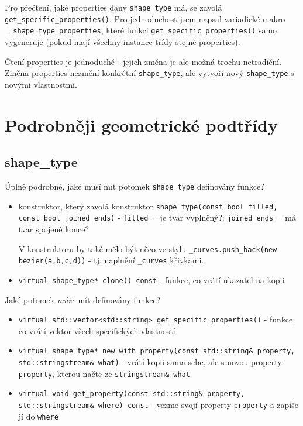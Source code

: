 \documentclass[11pt]{article} %
\begin{document}
Pro přečtení, jaké properties daný \texttt{shape\_type} má, se zavolá \texttt{get\_specific\_properties()}. Pro jednoduchost jsem napsal variadické makro \texttt{\_\_shape\_type\_properties}, které funkci \texttt{get\_specific\_properties()} samo vygeneruje (pokud mají všechny instance třídy stejné properties).

Čtení properties je jednoduché - jejich změna je ale možná trochu netradiční. Změna properties nezmění konkrétní \texttt{shape\_type}, ale vytvoří nový \texttt{shape\_type} s novými vlastnostmi.

\section{Podrobněji geometrické podtřídy}
\subsection{shape\_type}
Úplně podrobně, jaké musí mít potomek \texttt{shape\_type} definovány funkce?
\begin{itemize}
    \item konstruktor, který zavolá konstruktor \texttt{shape\_type(const bool filled, const bool joined\_ends)} - \texttt{filled} = je tvar vyplněný?; \texttt{joined\_ends} = má tvar spojené konce?

V konstruktoru by také mělo být něco ve stylu \texttt{\_curves.push\_back(new bezier(a,b,c,d))} - tj. naplnění \texttt{\_curves} křivkami.

    \item \texttt{virtual shape\_type* clone() const} - funkce, co vrátí ukazatel na kopii
\end{itemize}

Jaké potomek \emph{může} mít definovány funkce?

\begin{itemize}
    \item \texttt{virtual std::vector<std::string> get\_specific\_properties()} - funkce, co vrátí vektor všech specifických vlastností
    \item \texttt{virtual shape\_type* new\_with\_property(const std::string\& property, std::stringstream\& what)} - vrátí kopii sama sebe, ale s novou property \texttt{property}, kterou načte ze \texttt{stringstream\& what}
    \item \texttt{virtual void get\_property(const std::string\& property, std::stringstream\& where) const} - vezme svojí property \texttt{property} a zapíše jí do \texttt{where}
\end{itemize}
\end{document}
